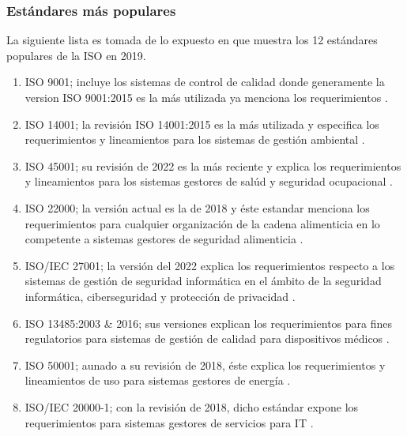 \subsubsection{Estándares más populares}
La siguiente lista es tomada de lo expuesto en \cite{horielikova-2022} %
que muestra los 12 estándares populares de la ISO en 2019.
\begin{enumerate}
    \item ISO 9001; incluye los sistemas de control de calidad donde generamente la version ISO 9001:2015 es la más utilizada ya menciona los requerimientos \cite{international-organization-for-standardization-2021C}. %
    \item ISO 14001; la revisión ISO 14001:2015 es la más utilizada y especifica los requerimientos y lineamientos para los sistemas de gestión ambiental \cite{international-organization-for-standardization-2022C}. %
    \item ISO 45001; su revisión de 2022 es la más reciente y explica los requerimientos y lineamientos para los sistemas gestores de salúd y seguridad ocupacional \cite{international-organization-for-standardization-2022B}. %
    \item ISO 22000; la versión actual es la de 2018 y éste estandar menciona los requerimientos para cualquier organización de la cadena alimenticia en lo competente a sistemas gestores de seguridad alimenticia \cite{international-organization-for-standardization-2021D}. %
    \item ISO/IEC 27001; la versión del 2022 explica los requerimientos respecto a los sistemas de gestión de seguridad informática en el ámbito de la seguridad informática, ciberseguridad y protección de privacidad \cite{international-organization-for-standardization-2023}. %
    \item ISO 13485:2003 \& 2016; sus versiones explican los requerimientos para fines regulatorios para sistemas de gestión de calidad para dispositivos médicos \cite{international-organization-for-standardization-2021A}. %
    \item ISO 50001; aunado a su revisión de 2018, éste explica los requerimientos y lineamientos de uso para sistemas gestores de energía \cite{international-organization-for-standarization-2021}. %
    \item ISO/IEC 20000-1; con la revisión de 2018, dicho estándar expone los requerimientos para sistemas gestores de servicios para IT \cite{international-organization-for-standardization-2021B}. %

\end{enumerate}
